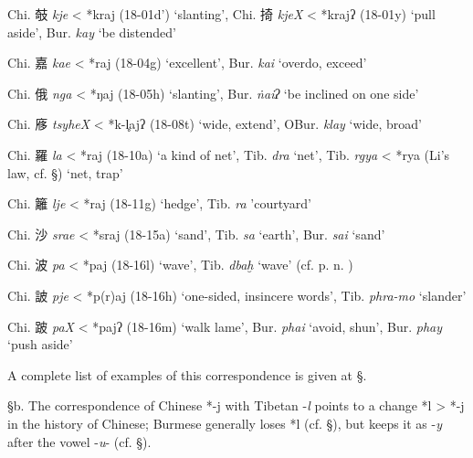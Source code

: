 \begin{description} \item
Chi. 攲  \emph{kje} \textless{} *kraj (18-01d') `slanting', Chi. 掎
 \emph{kjeX} \textless{} *krajʔ (18-01y) `pull aside', Bur. {} \emph{kay} `be distended'

\item
Chi. 嘉  \emph{kae} \textless{} *{}raj (18-04g) `excellent', Bur. {} \emph{kai} `overdo, exceed'

\item
Chi. 俄  \emph{nga} \textless{} *ŋ{}aj (18-05h) `slanting', Bur. {} \emph{ṅaiʔ} `be inclined on one side'

\item
Chi. 㢋 \emph{tsyheX} \textless{} *k-l̥ajʔ (18-08t) `wide, extend', OBur. {} \emph{klay} `wide, broad'

\item
Chi. 羅 \emph{la} \textless{} *r{}aj (18-10a) `a kind of net', Tib. {} \emph{dra} `net', Tib. {} \emph{rgya} \textless{} *rya (Li's law, cf.
§) `net, trap'

\item
Chi. 籬  \emph{lje} \textless{} *raj (18-11g) `hedge', Tib. {} \emph{ra}
'courtyard'

\item
Chi. 沙 \emph{srae} \textless{} *s{}raj (18-15a) `sand', Tib. {} \emph{sa} `earth', Bur. {} \emph{sai} `sand'

\item
Chi. 波  \emph{pa} \textless{} *p{}aj (18-16l) `wave', Tib. {} \emph{dbaḫ} `wave' (cf. p. n. )

\item
Chi. 詖  \emph{pje} \textless{} *p(r)aj (18-16h) `one-sided, insincere
words', Tib. {} \emph{phra-mo} `slander'

\item
Chi. 跛 \emph{paX} \textless{} *p{}ajʔ (18-16m) `walk lame', Bur. {} \emph{phai} `avoid, shun', Bur. {} \emph{phay} `push aside'
\end{description}

A complete list of examples of this correspondence is given at §.

§b. The correspondence of Chinese *-j with Tibetan -\emph{l} points to a
change *l \textgreater{} *-j in the history of Chinese; Burmese
generally loses *l (cf. §), but keeps it as -\emph{y} after the vowel
-\emph{u}- (cf. §).


